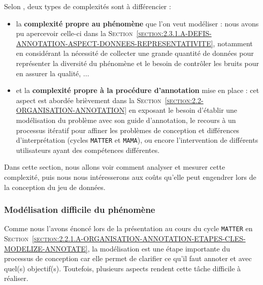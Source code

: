 		Selon \cite{baledent:2022:complexite-annotation-manuelle}, deux types de complexités sont à différencier :
		\begin{itemize}
			\item la \textbf{complexité propre au phénomène} que l'on veut modéliser :
			nous avons pu apercevoir celle-ci dans la \textsc{Section~\ref{section:2.3.1.A-DEFIS-ANNOTATION-ASPECT-DONNEES-REPRESENTATIVITE}}, notamment en considérant la nécessité de collecter une grande quantité de données pour représenter la diversité du phénomène et le besoin de contrôler les bruits pour en assurer la qualité, ...
			\item et la \textbf{complexité propre à la procédure d'annotation} mise en place :
			cet aspect est abordée brièvement dans la \textsc{Section~\ref{section:2.2-ORGANISATION-ANNOTATION}} en exposant le besoin d'établir une modélisation du problème avec son guide d'annotation, le recours à un processus itératif pour affiner les problèmes de conception et différences d'interprétation (cycles \texttt{MATTER} et \texttt{MAMA}), ou encore l'intervention de différents utilisateurs ayant des compétences différentes.
		\end{itemize}
		Dans cette section, nous allons voir comment analyser et mesurer cette complexité, puis nous nous intéresserons aux coûts qu'elle peut engendrer lors de la conception du jeu de données.
		
		
		\subsubsection{Modélisation difficile du phénomène}
		\label{section:2.3.2.A-DEFIS-ANNOTATION-ASPECT-COMPLEXITE-MODELISATION}
		
			Comme nous l'avons énoncé lors de la présentation au cours du cycle \texttt{MATTER} en \textsc{Section~\ref{section:2.2.1.A-ORGANISATION-ANNOTATION-ETAPES-CLES-MODELIZE-ANNOTATE}}, la modélisation est une étape importante du processus de conception car elle permet de clarifier ce qu'il faut annoter et avec quel(s) objectif(s).
			Toutefois, plusieurs aspects rendent cette tâche difficile à réaliser.
			
